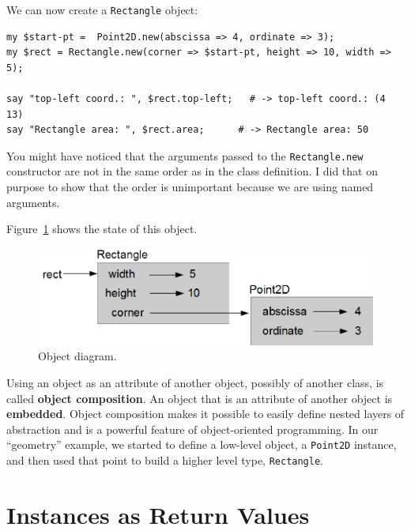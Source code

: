 We can now create a {\tt Rectangle} object:

\begin{verbatim}
my $start-pt =  Point2D.new(abscissa => 4, ordinate => 3);
my $rect = Rectangle.new(corner => $start-pt, height => 10, width => 5);

say "top-left coord.: ", $rect.top-left;   # -> top-left coord.: (4 13)
say "Rectangle area: ", $rect.area;      # -> Rectangle area: 50
\end{verbatim}

You might have noticed that the arguments passed to the 
{\tt Rectangle.new} constructor are not in the same order as 
in the class definition. I did that on purpose 
to show that the order is unimportant because we 
are using named arguments.

Figure~\ref{fig.rectangle} shows the state of this object.

\begin{figure}
\centerline
{\includegraphics[scale=0.8]{figs/rectangle.png}}
\caption{Object diagram.}
\label{fig.rectangle}
\end{figure}


Using an object as an attribute of another object, possibly 
of another class, is called {\bf object composition}. An object 
that is an attribute of another object is {\bf embedded}. Object 
composition makes it possible to easily define nested layers of 
abstraction and is a powerful feature of object-oriented 
programming. In our ``geometry'' example, we started to define 
a low-level object, a {\tt Point2D} instance, and then used 
that point to build a higher level type, {\tt Rectangle}.


\section{Instances as Return Values}

